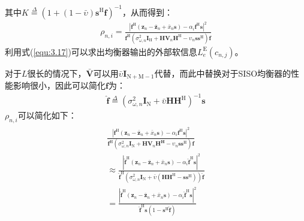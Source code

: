 其中$K\overset{\Delta}{=}(1+(1-\bar{\upsilon})\mathbf{s}^{\mathrm{H}}\mathbf{f})^{-1}$，从而得到：
\begin{eqnarray}
    \rho_{n,i}=\frac{|\mathbf{f}^{\mathrm{H}}(\mathbf{z}_n-\bar{\mathbf{z}}_n+\bar{x}_n\mathbf{s})-\alpha_i\mathbf{f}^{\mathrm{H}}\mathbf{s}|^2}{\mathbf{f}^{\mathrm{H}}(\sigma_{\omega,n}^2\mathbf{I}_{\mathrm{H}}+\mathbf{H}\mathbf{V}_n\mathbf{H}^{\mathrm{H}}-\upsilon_n\mathbf{s}\mathbf{s}^{\mathrm{H}})\mathbf{f}}
    \label{equ:3.35}
\end{eqnarray}
利用式(\ref{equ:3.17})可以求出均衡器输出的外部软信息$L_e^{\mathrm{E}}(c_{n,j})$。

对于$L$很长的情况下，$\bar{\mathbf{V}}$可以用$\bar{\upsilon}\mathbf{I}_{\mathrm{N+M}-1}$代替，而此中替换对于SISO均衡器的性能影响很小，因此可以简化$\mathbf{f}$为：
\begin{eqnarray}
    \hat{\mathbf{f}}\overset{\Delta}{=}(\sigma_{\omega,n}^2\mathbf{I}_{\mathrm{N}}+\bar{\upsilon}\mathbf{H}\mathbf{H}^{\mathrm{H}})^{-1}\mathbf{s}
    \label{equ:3.36}
\end{eqnarray}
$\rho_{n,i}$可以简化如下：
\begin{eqnarray}
    \begin{array}{c}
        \frac{\displaystyle
        |\mathbf{f}^{\mathrm{H}}(\mathbf{z}_n-\bar{\mathbf{z}}_n+\bar{x}_n\mathbf{s})-\alpha_i\mathbf{f}^{\mathrm{H}}\mathbf{s}|^2}{\displaystyle
        \mathbf{f}^{\mathrm{H}}(\sigma_{\omega,n}^2\mathbf{I}_{\mathrm{N}}+\mathbf{H}\mathbf{V}_n\mathbf{H}^{\mathbf{H}}-\upsilon_n\mathbf{s}\mathbf{s}^{\mathrm{H}})\mathbf{f}}\\
        \approx
        \frac{\displaystyle
        |\hat{\mathbf{f}}^{\mathrm{H}}(\mathbf{z}_n-\bar{\mathbf{z}}_n+\bar{x}_n\mathbf{s})-\alpha_i\hat{\mathbf{f}}^{\mathrm{H}}\mathbf{s}|^2}{\displaystyle
        \hat{\mathbf{f}}^{\mathrm{H}}(\sigma_{\omega,n}^2\mathbf{I}_{\mathrm{N}}+\bar{\upsilon}(\mathbf{H}\mathbf{H}^{\mathrm{H}}-\mathbf{s}\mathbf{s}^{\mathrm{H}}))\hat{\mathbf{f}}}\\
        =\frac{\displaystyle
        |\hat{\mathbf{f}}^{\mathrm{H}}(\mathbf{z}_n-\bar{\mathbf{z}}_n+\bar{x}_n\mathbf{s})-\alpha_i\hat{\mathbf{f}}^{\mathrm{H}}\mathbf{s}|^2}{\displaystyle \hat{\mathbf{f}}^{\mathrm{H}}\mathbf{s}(1-\mathbf{s}^{\mathrm{H}}\hat{\mathbf{f}})}
    \end{array}
    \label{equ:3.37}
\end{eqnarray}

